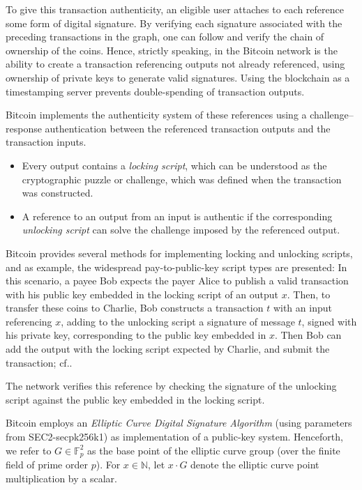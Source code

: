 \documentclass[a4paper,11pt,titlepage]{scrbook}
\begin{document}
To give this transaction authenticity, an eligible user attaches to each reference some form of digital signature.
By verifying each signature associated with the preceding transactions in the graph, one can follow and verify the chain of ownership of the coins.
Hence, strictly speaking,  in the Bitcoin network is the ability to create a transaction referencing outputs not already referenced, using ownership of private keys to generate valid signatures.
Using the blockchain as a timestamping server prevents double-spending of transaction outputs.

Bitcoin implements the authenticity system of these references using a challenge–response authentication between the referenced transaction outputs and the transaction inputs.

\begin{itemize}
    \item Every output contains a \emph{locking script}, which can be understood as the cryptographic puzzle or challenge, which was defined when the transaction was constructed.
    \item A reference to an output from an input is authentic if the corresponding \emph{unlocking script} can solve the challenge imposed by the referenced output.
\end{itemize}

Bitcoin provides several methods for implementing locking and unlocking scripts, and as example, the widespread pay-to-public-key script types are presented: In this scenario, a payee Bob expects the payer Alice to publish a valid transaction with his public key embedded in the locking script of an output $x$.
Then, to transfer these coins to Charlie, Bob constructs a transaction $t$ with an input referencing $x$, adding to the unlocking script a signature of message $t$, signed with his private key, corresponding to the public key embedded in $x$.
Then Bob can add the output with the locking script expected by Charlie, and submit the transaction; cf.\@ \cite[Chap.~6--7]{antonopoulos_mastering_2017}.


The network verifies this reference by checking the signature of the unlocking script against the public key embedded in the locking script.


Bitcoin employs an \emph{Elliptic Curve Digital Signature Algorithm} (using parameters from SEC2-secpk256k1) as implementation of a public-key system.
Henceforth, we refer to $G\in \mathbb{F}_p^2$ as the base point of the elliptic curve group (over the finite field of prime order $p$). For $x\in \mathbb{N}$, let $x\cdot G$ denote the elliptic curve point multiplication by a scalar.
\end{document}
